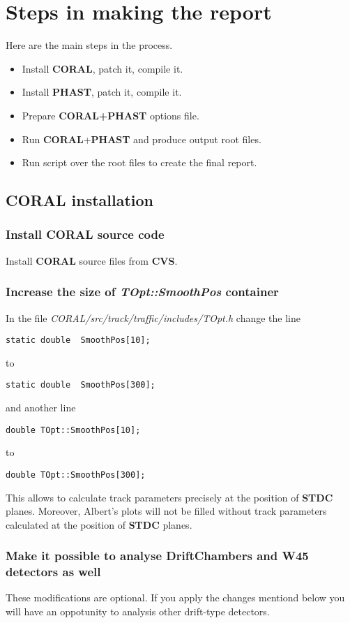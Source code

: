 \documentclass[a4paper,12pt]{article}
\begin{document}
\section{Steps in making the report}

Here are the main steps in the process.

\begin{itemize}
\item Install {\bf CORAL}, patch it, compile it. 
\item Install {\bf PHAST}, patch it, compile it.
\item Prepare {\bf CORAL+PHAST} options file.
\item Run {\bf CORAL}+{\bf PHAST} and produce output root files.
\item Run script over the root files to create the final report.
\end{itemize}

\subsection{{\bf CORAL} installation}
\subsubsection{Install {\bf CORAL} source code}
Install {\bf CORAL} source files from {\bf CVS}.
\subsubsection{Increase the size of {\it TOpt::SmoothPos} container}
In the file {\it CORAL/src/track/traffic/includes/TOpt.h} change the line
\begin{verbatim}
static double  SmoothPos[10];
\end{verbatim}
to
\begin{verbatim}
static double  SmoothPos[300];
\end{verbatim}
and another line
\begin{verbatim}
double TOpt::SmoothPos[10];
\end{verbatim}
to
\begin{verbatim}
double TOpt::SmoothPos[300];
\end{verbatim}
This allows to calculate track parameters precisely at the position of
{\bf STDC} planes. Moreover, Albert's plots will not be filled without track
parameters calculated at the position of {\bf STDC} planes.
\subsubsection{Make it possible to analyse DriftChambers and W45 detectors as well}
These modifications are optional. If you apply the changes mentiond below you
will have an oppotunity to analysis other drift-type detectors.
\end{document}
